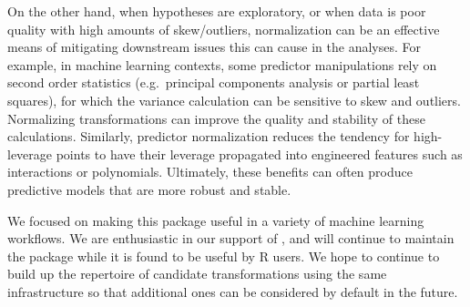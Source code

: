 On the other hand, when hypotheses are exploratory, or when data is poor
quality with high amounts of skew/outliers, normalization can be an
effective means of mitigating downstream issues this can cause in the
analyses. For example, in machine learning contexts, some predictor
manipulations rely on second order statistics (e.g.~principal components
analysis or partial least squares), for which the variance calculation
can be sensitive to skew and outliers. Normalizing transformations can
improve the quality and stability of these calculations. Similarly,
predictor normalization reduces the tendency for high-leverage points to
have their leverage propagated into engineered features such as
interactions or polynomials. Ultimately, these benefits can often
produce predictive models that are more robust and stable.

We focused on making this package useful in a variety of machine
learning workflows. We are enthusiastic in our support of
, and will continue to maintain the package while it
is found to be useful by R users. We hope to continue to build up the
repertoire of candidate transformations using the same infrastructure so
that additional ones can be considered by default in the future.



\address{%
Ryan A. Peterson\\
Department of Biostatistics and Informatics\\%
University of Colorado Anschutz Medical Campus \\
13001 East 17th Place Aurora, Colorado 80045 \\
ORCID: \href{https://orcid.org/0000-0002-4650-5798}{0000-0002-4650-5798} \\
%
\url{https://petersonr.github.io/}%
%
\\
}

